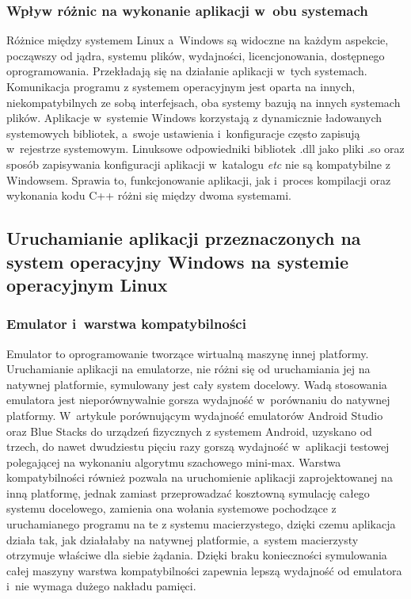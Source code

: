 \subsubsection{Wpływ różnic na wykonanie aplikacji w~obu systemach}
Różnice między systemem Linux a~Windows są widoczne na każdym aspekcie, począwszy od jądra, systemu plików, wydajności, licencjonowania, dostępnego oprogramowania. Przekładają się na działanie aplikacji w~tych systemach. Komunikacja programu z systemem operacyjnym jest oparta na innych, niekompatybilnych ze sobą interfejsach, oba systemy bazują na innych systemach plików. Aplikacje w~systemie Windows korzystają z dynamicznie ładowanych systemowych bibliotek, a~swoje ustawienia i~konfiguracje często zapisują w~rejestrze systemowym. Linuksowe odpowiedniki bibliotek .dll jako pliki .so oraz sposób zapisywania konfiguracji aplikacji w~katalogu \textit{\/etc\/} nie są kompatybilne z Windowsem. Sprawia to, funkcjonowanie aplikacji, jak i~proces kompilacji oraz wykonania kodu C++ różni się między dwoma systemami.

\subsection{Uruchamianie aplikacji przeznaczonych na system operacyjny Windows na systemie operacyjnym Linux}
\subsubsection{Emulator i~warstwa kompatybilności}
Emulator to oprogramowanie tworzące wirtualną maszynę innej platformy. Uruchamianie aplikacji na emulatorze, nie różni się od uruchamiania jej na natywnej platformie, symulowany jest cały system docelowy. Wadą stosowania emulatora jest nieporównywalnie gorsza wydajność w~porównaniu do natywnej platformy. W~artykule\cite{emulatorPerformance} porównującym wydajność emulatorów Android Studio oraz Blue Stacks do urządzeń fizycznych z systemem Android, uzyskano od trzech, do nawet dwudziestu pięciu razy gorszą wydajność w~aplikacji testowej polegającej na wykonaniu algorytmu szachowego mini-max. Warstwa kompatybilności również pozwala na uruchomienie aplikacji zaprojektowanej na inną platformę, jednak zamiast przeprowadzać kosztowną symulację całego systemu docelowego, zamienia ona wołania systemowe pochodzące z uruchamianego programu na te z systemu macierzystego, dzięki czemu aplikacja działa tak, jak działałaby na natywnej platformie, a~system macierzysty otrzymuje właściwe dla siebie żądania. Dzięki braku konieczności symulowania całej maszyny warstwa kompatybilności zapewnia lepszą wydajność od emulatora i~nie wymaga dużego nakładu pamięci.

